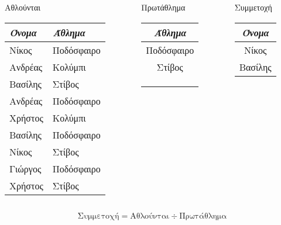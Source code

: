 \begin{frame}[shrink]
\begin{frame}[shrink]
\begin{columns}

\begin{column}{0.4\textwidth} Αθλούνται
  \begin{tabular}{ l l }           \hline
  \emph{Όνομα} & \emph{Άθλημα} \\  \hline
  Νίκος & Ποδόσφαιρο \\ 
  Ανδρέας & Κολύμπι \\ 
  Βασίλης & Στίβος \\ 
  Ανδρέας & Ποδόσφαιρο \\ 
  Χρήστος & Κολύμπι  \\
  Βασίλης & Ποδόσφαιρο \\
  Νίκος   & Στίβος  \\
  Γιώργος & Ποδόσφαιρο \\
  Χρήστος & Στίβος     \\           \hline
  \end{tabular}
\end{column}
\hspace{1cm}

\begin{column}{0.3\textwidth} Πρωτάθλημα
  \begin{tabular}{ c } \hline
  \emph{Άθλημα }\\ \hline  
  Ποδόσφαιρο \\
  Στίβος \\ \hline \\ \\ \\
  \end{tabular}
\end{column}

\begin{column}{0.3\textwidth} Συμμετοχή
  \begin{tabular}{ c } \hline
  \emph{Όνομα} \\ \hline 
  Νίκος \\
  Βασίλης \\    \hline   
  \end{tabular}
\end{column}
\end{columns}

\[ \text{Συμμετοχή} = \text{Αθλούνται} \div \text{Πρωτάθλημα} \]


\end{frame}
\end{frame}
